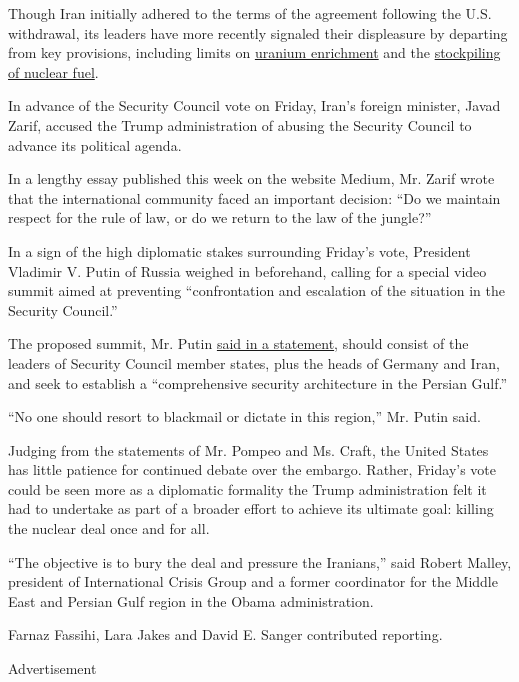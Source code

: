 Though Iran initially adhered to the terms of the agreement following
the U.S. withdrawal, its leaders have more recently signaled their
displeasure by departing from key provisions, including limits on
\href{https://www.nytimes3xbfgragh.onion/2019/07/07/world/middleeast/iran-nuclear-limits-breach.html?searchResultPosition=1}{uranium
enrichment} and the
\href{https://www.nytimes3xbfgragh.onion/2019/07/01/us/politics/iran-nuclear-limit-compliance.html}{stockpiling
of nuclear fuel}.

In advance of the Security Council vote on Friday, Iran's foreign
minister, Javad Zarif, accused the Trump administration of abusing the
Security Council to advance its political agenda.

In a lengthy essay published this week on the website Medium, Mr. Zarif
wrote that the international community faced an important decision: ``Do
we maintain respect for the rule of law, or do we return to the law of
the jungle?''

In a sign of the high diplomatic stakes surrounding Friday's vote,
President Vladimir V. Putin of Russia weighed in beforehand, calling for
a special video summit aimed at preventing ``confrontation and
escalation of the situation in the Security Council.''

The proposed summit, Mr. Putin
\href{https://twitter.com/Dpol_un/status/1294284430647992321}{said in a
statement}, should consist of the leaders of Security Council member
states, plus the heads of Germany and Iran, and seek to establish a
``comprehensive security architecture in the Persian Gulf.''

``No one should resort to blackmail or dictate in this region,'' Mr.
Putin said.

Judging from the statements of Mr. Pompeo and Ms. Craft, the United
States has little patience for continued debate over the embargo.
Rather, Friday's vote could be seen more as a diplomatic formality the
Trump administration felt it had to undertake as part of a broader
effort to achieve its ultimate goal: killing the nuclear deal once and
for all.

``The objective is to bury the deal and pressure the Iranians,'' said
Robert Malley, president of International Crisis Group and a former
coordinator for the Middle East and Persian Gulf region in the Obama
administration.

Farnaz Fassihi, Lara Jakes and David E. Sanger contributed reporting.

Advertisement


